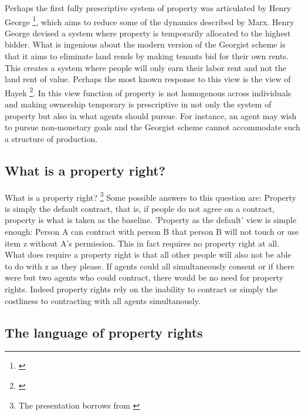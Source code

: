 \documentclass[12pt]{article}
\numberwithin{equation}{section}
\begin{document}
Perhaps the first fully prescriptive system of property was articulated by Henry George \footnote{\cite{progress}}, which aims to reduce some of the dynamics described by Marx. Henry George devised a system where property is temporarily allocated to the highest bidder. What is ingenious about the modern version of the Georgist scheme is that it aims to eliminate land rends by making tenants bid for their own rents. This creates a system where people will only earn their labor rent and not the land rent of value. Perhaps the most known response to this view is the view of Hayek \footnote{\cite{Fatal}}. In this view function of property is not homogenous across individuals and making ownership temporary is prescriptive in not only the system of property but also in what agents should pursue. For instance, an agent may wish to pursue non-monetary goals and the Georgist scheme cannot accommodate such a structure of production.


\newpage


\subsection{What is a property right?}

What is a property right? \footnote{The presentation borrows from \cite{Munzer1990}}
Some possible answers to this question are: Property is simply the default contract, that is, if people do not agree on a contract, property is what is taken as the baseline. 'Property as the default' view is simple enough: Person A can contract with person B that person B will not touch or use item z without A's permission. This in fact requires no property right at all. What does require a property right is that all other people will also not be able to do with z as they please. If agents could all simultaneously consent or if there were but two agents who could contract, there would be no need for property rights. Indeed property rights rely on the inability to contract or simply the costliness to contracting with all agents simultanously.  



\subsection{The language of property rights}
\end{document}
